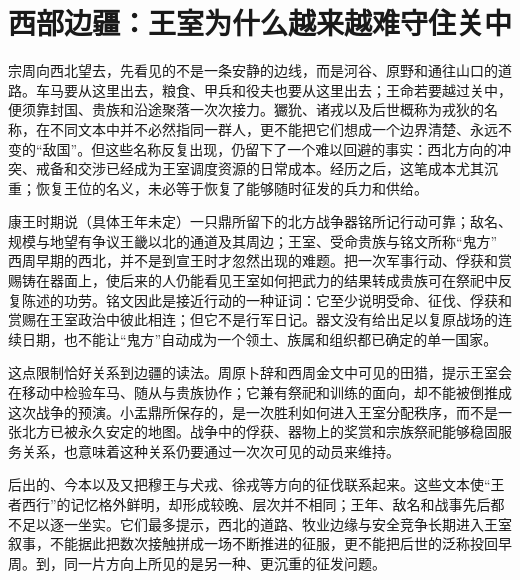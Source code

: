 \section{西部边疆：王室为什么越来越难守住关中}

宗周向西北望去，先看见的不是一条安静的边线，而是河谷、原野和通往山口的道路。车马要从这里出去，粮食、甲兵和役夫也要从这里出去；王命若要越过关中，便须靠封国、贵族和沿途聚落一次次接力。玁狁、诸戎以及后世概称为戎狄的名称，在不同文本中并不必然指同一群人，更不能把它们想成一个边界清楚、永远不变的“敌国”。但这些名称反复出现，仍留下了一个难以回避的事实：西北方向的冲突、戒备和交涉已经成为王室调度资源的日常成本。经历之后，这笔成本尤其沉重；恢复王位的名义，未必等于恢复了能够随时征发的兵力和供给。

\begin{event}{康王时期说（具体王年未定）}{一只鼎所留下的北方战争}{器铭所记行动可靠；敌名、规模与地望有争议}{王畿以北的通道及其周边；王室、受命贵族与铭文所称“鬼方”}
西周早期的西北，并不是到宣王时才忽然出现的难题。把一次军事行动、俘获和赏赐铸在器面上，使后来的人仍能看见王室如何把武力的结果转成贵族可在祭祀中反复陈述的功劳。铭文因此是接近行动的一种证词：它至少说明受命、征伐、俘获和赏赐在王室政治中彼此相连；但它不是行军日记。器文没有给出足以复原战场的连续日期，也不能让“鬼方”自动成为一个领土、族属和组织都已确定的单一国家。

这点限制恰好关系到边疆的读法。周原卜辞和西周金文中可见的田猎，提示王室会在移动中检验车马、随从与贵族协作；它兼有祭祀和训练的面向，却不能被倒推成这次战争的预演。小盂鼎所保存的，是一次胜利如何进入王室分配秩序，而不是一张北方已被永久安定的地图。战争中的俘获、器物上的奖赏和宗族祭祀能够稳固服务关系，也意味着这种关系仍要通过一次次可见的动员来维持。

后出的、今本以及又把穆王与犬戎、徐戎等方向的征伐联系起来。这些文本使“王者西行”的记忆格外鲜明，却形成较晚、层次并不相同；王年、敌名和战事先后都不足以逐一坐实。它们最多提示，西北的道路、牧业边缘与安全竞争长期进入王室叙事，不能据此把数次接触拼成一场不断推进的征服，更不能把后世的泛称投回早周。到，同一片方向上所见的是另一种、更沉重的征发问题。
\end{event}

